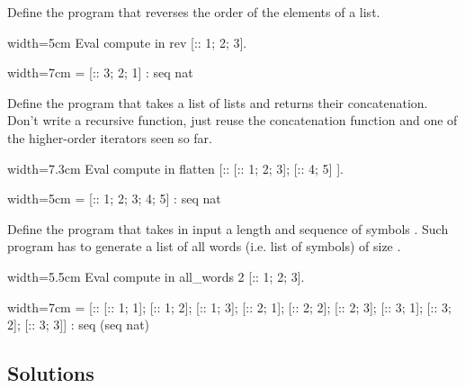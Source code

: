 \begin{Exercise}[label=ex:rev,difficulty=0,title={List reversal}]
Define the program  that reverses the order of the elements
of a list.

\begin{coq}{}{width=5cm}
Eval compute in
  rev [:: 1; 2; 3].
\end{coq}
\begin{coqout}{}{width=7cm}
 = [:: 3; 2; 1]
 : seq nat
\end{coqout}
\end{Exercise}

\begin{Exercise}[label=ex:flatten,difficulty=1,title={List flattening}]
Define the program  that takes a list of lists and returns
their concatenation.  Don't write a recursive function, just reuse
the concatenation function and one of the higher-order iterators
seen so far.

\begin{coq}{}{width=7.3cm}
Eval compute in
  flatten [:: [:: 1; 2; 3]; [:: 4; 5] ].
\end{coq}
\begin{coqout}{}{width=5cm}
 = [:: 1; 2; 3; 4; 5]
 : seq nat
\end{coqout}
\end{Exercise}


\begin{Exercise}[label=ex:allwords,difficulty=2,title={All words of size n}]
Define the  program that takes in input a
length  and sequence of symbols .
Such program has to generate a list of all words (i.e. list
of symbols) of size .

\begin{coq}{}{width=5.5cm}
Eval compute in
  all_words 2 [:: 1; 2; 3].
\end{coq}
\begin{coqout}{}{width=7cm}
 = [:: [:: 1; 1]; [:: 1; 2]; [:: 1; 3];
       [:: 2; 1]; [:: 2; 2]; [:: 2; 3];
       [:: 3; 1]; [:: 3; 2]; [:: 3; 3]]
 : seq (seq nat)
\end{coqout}
\end{Exercise}

\subsection{Solutions}

